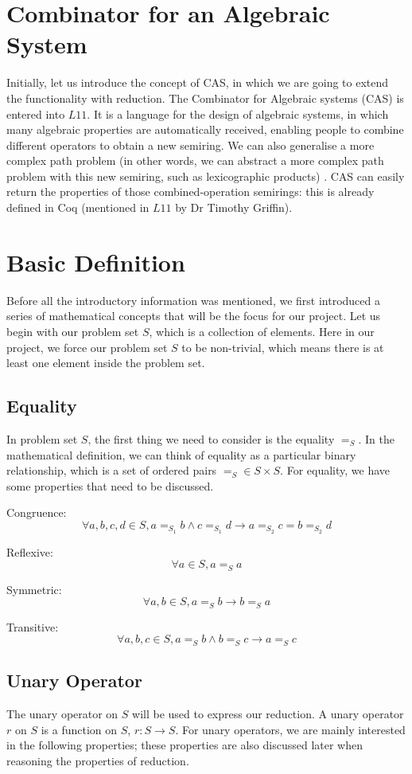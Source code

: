 \documentclass[a4paper,12pt,twoside,openright]{report}
\newcommand{\e}[2]{
\begin{equation}
  \label{#1} 
  #2
\end{equation}
}
\begin{document}
\section{Combinator for an Algebraic System}
Initially, let us introduce the concept of CAS, in which we are going to extend the functionality with reduction.
The Combinator for Algebraic systems (CAS)\cite{griffin_metarouting_2005} is entered into $L11$. It is a language for the design of algebraic systems, in which many algebraic properties are automatically received, enabling people to combine different operators to obtain a new semiring\cite{griffin_metarouting_2005}. We can also generalise a more complex path problem (in other words, we can abstract a more complex path problem with this new semiring, such as lexicographic products) \cite{gurney_lexicographic_2007}. CAS can easily return the properties of those combined-operation semirings: this is already defined in Coq\cite{Coq} (mentioned in $L11$ by Dr Timothy Griffin).

\section{Basic Definition}
Before all the introductory information was mentioned, we first introduced a series of mathematical concepts that will be the focus for our project.  
Let us begin with our problem set $S$, which is a collection of elements. Here in our project, we force our problem set $S$ to be non-trivial, which means there is at least one element inside the problem set.

\subsection{Equality}
In problem set $S$, the first thing we need to consider is the equality $=_S$. 
In the mathematical definition, we can think of equality as a particular binary relationship, which is a set of ordered pairs $=_S \in S \times S$. For equality, we have some properties that need to be discussed. 

Congruence: \e{def:eq:congruence}{\forall a,b,c,d \in S, a =_{S_1} b \wedge c =_{S_1} d \rightarrow a =_{S_2} c = b =_{S_2} d}
Reflexive: \e{def:eq:reflexive}{\forall a \in S, a =_S a}
Symmetric: \e{def:eq:symmetric}{\forall a,b \in S, a =_S b \rightarrow b =_S a}
Transitive: \e{def:eq:transitive}{\forall a,b,c \in S, a =_S b \wedge b=_S c \rightarrow a =_S c}

\subsection{Unary Operator}
The unary operator on $S$ will be used to express our reduction. A unary operator $r$ on $S$ is a function on $S$, $r : S \rightarrow S$. 
For unary operators, we are mainly interested in the following properties; these properties are also discussed later when reasoning the properties of reduction.
\end{document}
